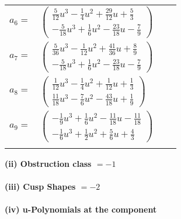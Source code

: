 \documentclass[1p]{elsarticle_modified}
\theoremstyle{definition}
\begin{document}
\begin{tabular}{m{7pt} m{180pt} m{7pt} m{180pt} }
\flushright $a_{6}=$&$\begin{pmatrix}\frac{5}{12} u^3-\frac{1}{4} u^2+\frac{29}{12} u+\frac{5}{3}\\-\frac{5}{18} u^3+\frac{1}{6} u^2-\frac{23}{18} u-\frac{7}{9}\end{pmatrix}$ \\
\flushright $a_{7}=$&$\begin{pmatrix}\frac{5}{36} u^3-\frac{1}{12} u^2+\frac{41}{36} u+\frac{8}{9}\\-\frac{5}{18} u^3+\frac{1}{6} u^2-\frac{23}{18} u-\frac{7}{9}\end{pmatrix}$ \\
\flushright $a_{8}=$&$\begin{pmatrix}\frac{1}{12} u^3-\frac{1}{4} u^2+\frac{1}{12} u+\frac{1}{3}\\\frac{11}{18} u^3-\frac{7}{6} u^2-\frac{43}{18} u+\frac{1}{9}\end{pmatrix}$ \\
\flushright $a_{9}=$&$\begin{pmatrix}-\frac{1}{9} u^3+\frac{1}{6} u^2-\frac{11}{18} u-\frac{11}{18}\\-\frac{1}{6} u^3+\frac{1}{2} u^2+\frac{5}{6} u+\frac{4}{3}\end{pmatrix}$\\&\end{tabular}
\flushleft \textbf{(ii) Obstruction class $= -1$}\\~\\
\flushleft \textbf{(iii) Cusp Shapes $= -2$}\\~\\
\newpage\renewcommand{\arraystretch}{1}
\flushleft \textbf{(iv) u-Polynomials at the component}\newline \\
\end{document}

